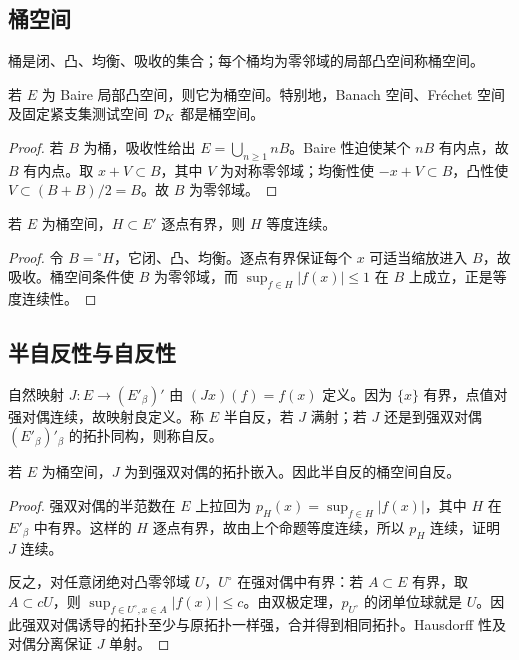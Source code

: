 \subsection*{桶空间}
\label{sec:yosida-05-app-02}
桶是闭、凸、均衡、吸收的集合；每个桶均为零邻域的局部凸空间称桶空间。

\begin{proposition}
若 $E$ 为 Baire 局部凸空间，则它为桶空间。特别地，Banach 空间、Fr\'echet 空间及固定紧支集测试空间 $\mathcal{D}_K$ 都是桶空间。
\end{proposition}
\begin{proof}
若 $B$ 为桶，吸收性给出 $E=\bigcup_{n\ge1}nB$。Baire 性迫使某个 $nB$ 有内点，故 $B$ 有内点。取 $x+V\subset B$，其中 $V$ 为对称零邻域；均衡性使 $-x+V\subset B$，凸性使 $V\subset(B+B)/2=B$。故 $B$ 为零邻域。
\end{proof}

\begin{proposition}[桶空间的一致有界性]
若 $E$ 为桶空间，$H\subset E'$ 逐点有界，则 $H$ 等度连续。
\end{proposition}
\begin{proof}
令 $B={}^\circ H$，它闭、凸、均衡。逐点有界保证每个 $x$ 可适当缩放进入 $B$，故吸收。桶空间条件使 $B$ 为零邻域，而 $\sup_{f\in H}|f(x)|\le1$ 在 $B$ 上成立，正是等度连续性。
\end{proof}

\subsection*{半自反性与自反性}
\label{sec:yosida-05-app-03}
自然映射 $J:E\to(E'_\beta)'$ 由 $(Jx)(f)=f(x)$ 定义。因为 $\{x\}$ 有界，点值对强对偶连续，故映射良定义。称 $E$ 半自反，若 $J$ 满射；若 $J$ 还是到强双对偶 $(E'_\beta)'_\beta$ 的拓扑同构，则称自反。

\begin{proposition}[桶空间上的自然嵌入]
若 $E$ 为桶空间，$J$ 为到强双对偶的拓扑嵌入。因此半自反的桶空间自反。
\end{proposition}
\begin{proof}
强双对偶的半范数在 $E$ 上拉回为 $p_H(x)=\sup_{f\in H}|f(x)|$，其中 $H$ 在 $E'_\beta$ 中有界。这样的 $H$ 逐点有界，故由上个命题等度连续，所以 $p_H$ 连续，证明 $J$ 连续。

反之，对任意闭绝对凸零邻域 $U$，$U^\circ$ 在强对偶中有界：若 $A\subset E$ 有界，取 $A\subset cU$，则 $\sup_{f\in U^\circ,x\in A}|f(x)|\le c$。由双极定理，$p_{U^\circ}$ 的闭单位球就是 $U$。因此强双对偶诱导的拓扑至少与原拓扑一样强，合并得到相同拓扑。Hausdorff 性及对偶分离保证 $J$ 单射。
\end{proof}

